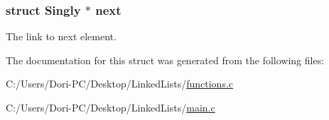 \subsubsection[{\texorpdfstring{next}{next}}]{\setlength{\rightskip}{0pt plus 5cm}struct {\bf Singly} $\ast$ next}\hypertarget{struct_singly_a17f77df43a5e1b76dd03f97965a14f5f}{}\label{struct_singly_a17f77df43a5e1b76dd03f97965a14f5f}


The link to next element. 



The documentation for this struct was generated from the following files\+:\begin{DoxyCompactItemize}
\item 
C\+:/\+Users/\+Dori-\/\+P\+C/\+Desktop/\+Linked\+Lists/\hyperlink{functions_8c}{functions.\+c}\item 
C\+:/\+Users/\+Dori-\/\+P\+C/\+Desktop/\+Linked\+Lists/\hyperlink{main_8c}{main.\+c}\end{DoxyCompactItemize}
